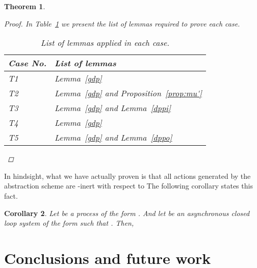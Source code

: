 \documentclass[copyright]{eptcs}
\theoremstyle{plain}
\newtheorem{theorem}{Theorem}[section]
\newtheorem{corollary}[theorem]{Corollary}
\theoremstyle{definition}
\begin{document}
\begin{theorem}
\begin{proof}
In Table~\ref{lemma-applicable} we present the list of lemmas required to prove each case.

\begin{table}
  \centering
  \begin{tabular}{|l|l|}
    \hline
    Case No. & List of lemmas\\
    \hline
T1 & Lemma~\ref{gdp} \\
    T2 & Lemma~\ref{gdp} and Proposition~\ref{prop:mu'} \\
    T3 & Lemma~\ref{gdp} and Lemma~\ref{dppi}\\
    T4 & Lemma~\ref{gdp} \\
    T5 & Lemma~\ref{gdp} and Lemma~\ref{dppo} \\
    \hline
  \end{tabular}
  \caption{List of lemmas applied in each case.}\label{lemma-applicable}
\end{table}

\end{proof}
\end{theorem}

In hindsight, what we have actually proven is that all  actions generated by the abstraction scheme are -inert with respect to  The following corollary states this fact.

\begin{corollary}\label{thm:tauinert}
Let  be a process of the form . And let  be an asynchronous closed loop system of the form  such that . Then,

\end{corollary}

\section{Conclusions and future work}\label{sec:discussion}
\end{document}
